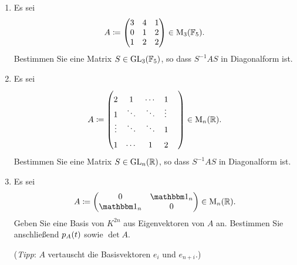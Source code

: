 \documentclass[a4paper, 10pt]{scrartcl}
\begin{document}
\begin{question}[subtitle = Diagonalisieren]
  \begin{enumerate}
    \item
      Es sei
      \[
                  A
        \coloneqq \begin{pmatrix}
                    3 & 4 & 1 \\
                    0 & 1 & 2 \\
                    1 & 2 & 2
                  \end{pmatrix}
        \in       \operatorname{M}_{3}(\mathbb{F}_5).
      \]
      Bestimmen Sie eine Matrix $S \in \operatorname{GL}_{3}(\mathbb{F}_5)$, so dass $S^{-1} A S$ in Diagonalform ist.
    \item
      Es sei
      \[
                  A
        \coloneqq \begin{pmatrix}
                    2       & 1       & \cdots  & 1       \phantom{\ddots}  \\
                    1       & \ddots  & \ddots  & \vdots  \phantom{\ddots}  \\
                    \vdots  & \ddots  & \ddots  & 1       \phantom{\ddots}  \\
                    1       & \cdots  & 1       & 2       \phantom{\ddots}
                  \end{pmatrix}
        \in       \operatorname{M}_{n}(\mathbb{R}).
      \]
      Bestimmen Sie eine Matrix $S \in \operatorname{GL}_{n}(\mathbb{R})$, so dass $S^{-1} A S$ in Diagonalform ist.
    \item
      Es sei
      \[
                  A
        \coloneqq \begin{pmatrix}
                    0     & \Id_n \\
                    \Id_n & 0
                  \end{pmatrix}
        \in       \matrices{n}{\Real}.
      \]
      Geben Sie eine Basis von $K^{2n}$ aus Eigenvektoren von $A$ an.
      Bestimmen Sie anschließend $p_{A}(t)$ sowie $\det A$.
      
      (\emph{Tipp}: $A$ vertauscht die Basisvektoren $e_i$ und $e_{n+i}$.)
  \end{enumerate}
\end{question}
\end{document}
